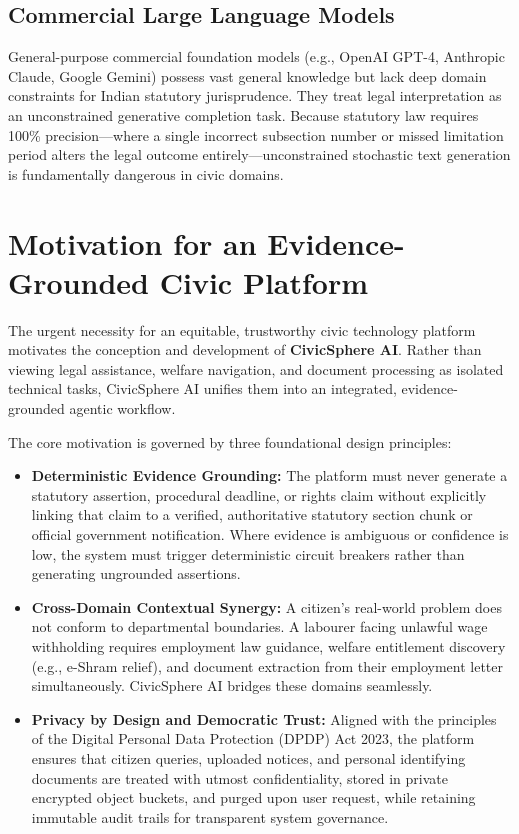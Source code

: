 \subsection{Commercial Large Language Models}
General-purpose commercial foundation models (e.g., OpenAI GPT-4, Anthropic Claude, Google Gemini) possess vast general knowledge but lack deep domain constraints for Indian statutory jurisprudence. They treat legal interpretation as an unconstrained generative completion task. Because statutory law requires 100\% precision---where a single incorrect subsection number or missed limitation period alters the legal outcome entirely---unconstrained stochastic text generation is fundamentally dangerous in civic domains.

\section{Motivation for an Evidence-Grounded Civic Platform}
\label{sec:motivation}
The urgent necessity for an equitable, trustworthy civic technology platform motivates the conception and development of \textbf{CivicSphere AI}. Rather than viewing legal assistance, welfare navigation, and document processing as isolated technical tasks, CivicSphere AI unifies them into an integrated, evidence-grounded agentic workflow.

The core motivation is governed by three foundational design principles:
\begin{itemize}
    \item \textbf{Deterministic Evidence Grounding:} The platform must never generate a statutory assertion, procedural deadline, or rights claim without explicitly linking that claim to a verified, authoritative statutory section chunk or official government notification. Where evidence is ambiguous or confidence is low, the system must trigger deterministic circuit breakers rather than generating ungrounded assertions.
    \item \textbf{Cross-Domain Contextual Synergy:} A citizen's real-world problem does not conform to departmental boundaries. A labourer facing unlawful wage withholding requires employment law guidance, welfare entitlement discovery (e.g., e-Shram relief), and document extraction from their employment letter simultaneously. CivicSphere AI bridges these domains seamlessly.
    \item \textbf{Privacy by Design and Democratic Trust:} Aligned with the principles of the Digital Personal Data Protection (DPDP) Act 2023, the platform ensures that citizen queries, uploaded notices, and personal identifying documents are treated with utmost confidentiality, stored in private encrypted object buckets, and purged upon user request, while retaining immutable audit trails for transparent system governance.
\end{itemize}
